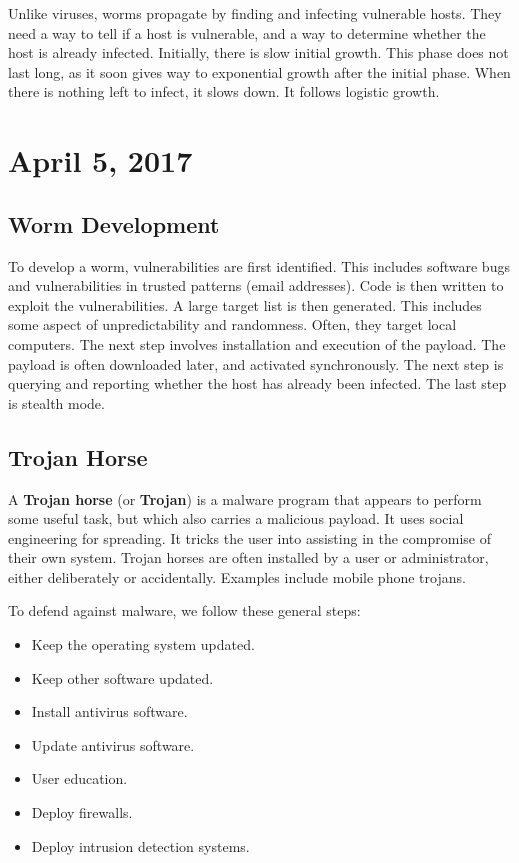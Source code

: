 \documentclass[11pt]{article}
\theoremstyle{plain} %
\theoremstyle{definition}
\theoremstyle{example}
\theoremstyle{remark}
\begin{document}
Unlike viruses, worms propagate by finding and infecting vulnerable hosts. They need a way to tell if a host is vulnerable, and a way to determine whether the host is already infected. Initially, there is slow initial growth. This phase does not last long, as it soon gives way to exponential growth after the initial phase. When there is nothing left to infect, it slows down. It follows logistic growth. 

\section{April 5, 2017}
\subsection{Worm Development}

To develop a worm, vulnerabilities are first identified. This includes software bugs and vulnerabilities in trusted patterns (email addresses). Code is then written to exploit the vulnerabilities. A large target list is then generated. This includes some aspect of unpredictability and randomness. Often, they target local computers. The next step involves installation and execution of the payload. The payload is often downloaded later, and activated synchronously. The next step is querying and reporting whether the host has already been infected. The last step is stealth mode. 

\subsection{Trojan Horse}

A \textbf{Trojan horse} (or \textbf{Trojan}) is a malware program that appears to perform some useful task, but which also carries a malicious payload. It uses social engineering for spreading. It tricks the user into assisting in the compromise of their own system. Trojan horses are often installed by a user or administrator, either deliberately or accidentally. Examples include mobile phone trojans.

To defend against malware, we follow these general steps:
\begin{itemize}
	\item Keep the operating system updated.
	\item Keep other software updated.
	\item Install antivirus software.
	\item Update antivirus software.
	\item User education.
	\item Deploy firewalls.
	\item Deploy intrusion detection systems.
\end{itemize}
\end{document}
